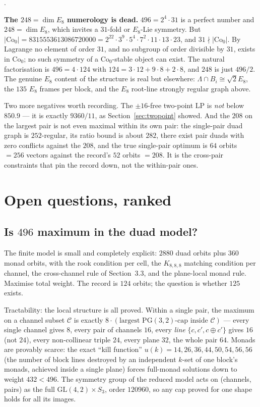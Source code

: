 \documentclass[10pt,a4paper]{article}
\newcounter{tightenum}
\newenvironment{tightenum}%
  {\begin{list}{\arabic{tightenum}.}{\usecounter{tightenum}%
     \setlength{\leftmargin}{1.8em}\setlength{\labelwidth}{1.2em}%
     \setlength{\labelsep}{0.6em}\setlength{\itemsep}{4pt}%
     \setlength{\topsep}{4pt}\setlength{\parsep}{0pt}}}%
  {\end{list}}
\newcommand{\Lam}{\Lambda}
\newcommand{\Co}{\mathrm{Co}_0}
\begin{document}
\begin{tightenum}
\item \textbf{The $248 = \dim E_8$ numerology is dead.} $496 = 2^4 \cdot 31$ is a perfect number and
  $248 = \dim E_8$, which invites a $31$-fold or $E_8$-Lie symmetry. But
  $|\Co| = 8315553613086720000 = 2^{22}\cdot 3^9 \cdot 5^4 \cdot 7^2 \cdot 11 \cdot 13 \cdot 23$,
  and $31 \nmid |\Co|$. By Lagrange no element of order $31$, and no subgroup of order divisible by
  $31$, exists in $\Co$; no such symmetry of a $\Co$-stable object can exist. The natural
  factorisation is $496 = 4 \cdot 124$ with $124 = 3\cdot12 + 9\cdot8 + 2\cdot8$, and $248$ is just
  $496/2$. The genuine $E_8$ content of the structure is real but elsewhere:
  $\Lam \cap B_i \cong \sqrt2 E_8$, the $135$ $E_8$ frames per block, and the $E_8$ root-line
  strongly regular graph above.
\end{tightenum}

Two more negatives worth recording. The $\pm 16$-free two-point LP is \emph{not} below $850.9$ ---
it is exactly $9360/11$, as Section~\ref{sec:twopoint} showed. And the $208$ on the largest pair is
not even maximal within its own pair: the single-pair duad graph is $252$-regular, its ratio bound
is about $282$, there exist pair duads with zero conflicts against the $208$, and the true
single-pair optimum is $64$ orbits $= 256$ vectors against the record's $52$ orbits $= 208$. It is
the cross-pair constraints that pin the record down, not the within-pair ones.

\section{Open questions, ranked}

\subsection{Is $496$ maximum in the duad model?}

The finite model is small and completely explicit: $2880$ duad orbits plus $360$ monad orbits, with
the rook condition per cell, the $K_{8,8,8}$ matching condition per channel, the cross-channel rule
of Section~3.3, and the plane-local monad rule. Maximise total weight. The record is $124$ orbits;
the question is whether $125$ exists.

Tractability: the local structure is all proved. Within a single pair, the maximum on a channel
subset $\mathcal{C}$ is exactly $8 \cdot (\text{largest }\mathrm{PG}(3,2)\text{-cap inside }
\mathcal{C})$ --- every single channel gives $8$, every pair of channels $16$, every \emph{line}
$\{c,c',c\oplus c'\}$ gives $16$ (not $24$), every non-collinear triple $24$, every plane $32$, the
whole pair $64$. Monads are provably scarce: the exact ``kill function'' $u(k) = 14, 26, 36, 44, 50,
54, 56, 56$ (the number of block lines destroyed by an independent $k$-set of one block's monads,
achieved inside a single plane) forces full-monad solutions down to weight $432 < 496$. The
symmetry group of the reduced model acts on (channels, pairs) as the full
$\mathrm{GL}(4,2) \times S_3$, order $120960$, so any cap proved for one shape holds for all its
images.
\end{document}
